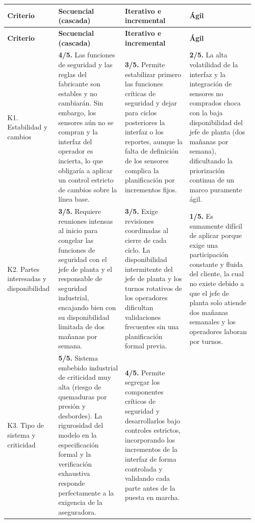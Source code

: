 \documentclass[11pt,a4paper]{article}
\begin{document}
	\begin{longtable}{|p{2.6cm}|*{3}{>{\raggedright\arraybackslash}p{\dimexpr(\textwidth-2.6cm-8\tabcolsep-5\arrayrulewidth)/3\relax}|}}
	\hline
	\textbf{Criterio} &
	\textbf{Secuencial (cascada)} &
	\textbf{Iterativo e incremental} &
	\textbf{Ágil} \\ \hline
	\endfirsthead
	\hline
	\textbf{Criterio} &
	\textbf{Secuencial (cascada)} &
	\textbf{Iterativo e incremental} &
	\textbf{Ágil} \\ \hline
	\endhead
	K1. Estabilidad y cambios &
	\textbf{4/5.} Las funciones de seguridad y las reglas del fabricante son estables y no cambiarán. Sin embargo, los sensores aún no se compran y la interfaz del operador es incierta, lo que obligaría a aplicar un control estricto de cambios sobre la línea base. &
	\textbf{3/5.} Permite estabilizar primero las funciones críticas de seguridad y dejar para ciclos posteriores la interfaz o los reportes, aunque la falta de definición de los sensores complica la planificación por incrementos fijos. &
	\textbf{2/5.} La alta volatilidad de la interfaz y la integración de sensores no comprados choca con la baja disponibilidad del jefe de planta (dos mañanas por semana), dificultando la priorización continua de un marco puramente ágil. \\ \hline
	K2. Partes interesadas y disponibilidad &
	\textbf{3/5.} Requiere reuniones intensas al inicio para congelar las funciones de seguridad con el jefe de planta y el responsable de seguridad industrial, encajando bien con su disponibilidad limitada de dos mañanas por semana. &
	\textbf{3/5.} Exige revisiones coordinadas al cierre de cada ciclo. La disponibilidad intermitente del jefe de planta y los turnos rotativos de los operadores dificultan validaciones frecuentes sin una planificación formal previa. &
	\textbf{1/5.} Es sumamente difícil de aplicar porque exige una participación constante y fluida del cliente, la cual no existe debido a que el jefe de planta solo atiende dos mañanas semanales y los operadores laboran por turnos. \\ \hline
	K3. Tipo de sistema y criticidad &
	\textbf{5/5.} Sistema embebido industrial de criticidad muy alta (riesgo de quemaduras por presión y desbordes). La rigurosidad del modelo en la especificación formal y la verificación exhaustiva responde perfectamente a la exigencia de la aseguradora. &
	\textbf{4/5.} Permite segregar los componentes críticos de seguridad y desarrollarlos bajo controles estrictos, incorporando los incrementos de la interfaz de forma controlada y validando cada parte antes de la puesta en marcha. &

\end{longtable}
\end{document}
